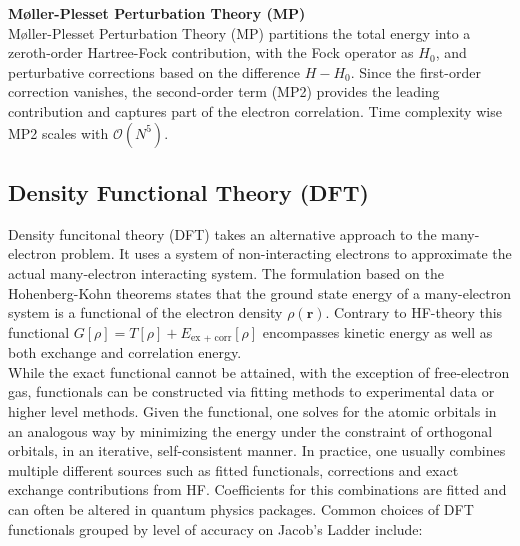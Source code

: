 \textbf{Møller-Plesset Perturbation Theory (MP)}\\
Møller-Plesset Perturbation Theory (MP) partitions the total energy into a zeroth-order Hartree-Fock contribution, with the Fock operator as $H_0$, and perturbative corrections based on the difference $H - H_0$. Since the first-order correction vanishes, the second-order term (MP2) provides the leading contribution and captures part of the electron correlation. Time complexity wise MP2 scales with $\mathcal{O}(N^5)$. 

\subsection{Density Functional Theory (DFT)}
\label{subsec:background_dft}
Density funcitonal theory (DFT) takes an alternative approach to the many-electron problem. It uses a system of non-interacting electrons to approximate the actual many-electron interacting system. The formulation based on the Hohenberg-Kohn theorems \parencite{ref:hohenberg_kohn1964} states that the ground state energy of a many-electron system is a functional of the electron density $\rho(\mathbf{r})$. Contrary to HF-theory this functional $G[\rho] = T[\rho] + E_{\text{ex + corr}}[\rho]$ encompasses kinetic energy as well as both exchange and correlation energy. \parencite{ref:kohn_sham_1965}\\
While the exact functional cannot be attained, with the exception of free-electron gas, functionals can be constructed via fitting methods to experimental data or higher level methods. Given the functional, one solves for the atomic orbitals in an analogous way by minimizing the energy under the constraint of orthogonal orbitals, in an iterative, self-consistent manner. In practice, one usually combines multiple different sources such as fitted functionals, corrections and exact exchange contributions from HF. Coefficients for this combinations are fitted and can often be altered in quantum physics packages. 
Common choices of DFT functionals grouped by level of accuracy on Jacob's Ladder include:

